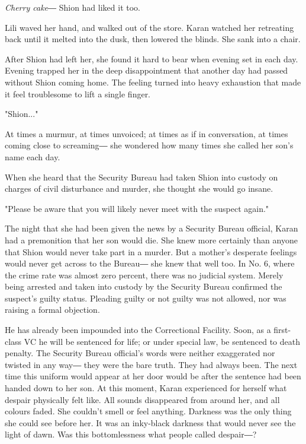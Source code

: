 \emph{Cherry cake―} Shion had liked it too.

Lili waved her hand, and walked out of the store. Karan watched her
retreating back until it melted into the dusk, then lowered the blinds.
She sank into a chair.

After Shion had left her, she found it hard to bear when evening set in
each day. Evening trapped her in the deep disappointment that another
day had passed without Shion coming home. The feeling turned into heavy
exhaustion that made it feel troublesome to lift a single finger.

"Shion..."

At times a murmur, at times unvoiced; at times as if in conversation, at
times coming close to screaming― she wondered how many times she called
her son's name each day.

When she heard that the Security Bureau had taken Shion into custody on
charges of civil disturbance and murder, she thought she would go
insane.

"Please be aware that you will likely never meet with the suspect
again."

The night that she had been given the news by a Security Bureau
official, Karan had a premonition that her son would die. She knew more
certainly than anyone that Shion would never take part in a murder. But
a mother's desperate feelings would never get across to the Bureau― she
knew that well too. In No. 6, where the crime rate was almost zero
percent, there was no judicial system. Merely being arrested and taken
into custody by the Security Bureau confirmed the suspect's guilty
status. Pleading guilty or not guilty was not allowed, nor was raising a
formal objection.

He has already been impounded into the Correctional Facility. Soon, as a
first-class VC he will be sentenced for life; or under special law, be
sentenced to death penalty. The Security Bureau official's words were
neither exaggerated nor twisted in any way― they were the bare truth.
They had always been. The next time this uniform would appear at her
door would be after the sentence had been handed down to her son. At
this moment, Karan experienced for herself what despair physically felt
like. All sounds disappeared from around her, and all colours faded. She
couldn't smell or feel anything. Darkness was the only thing she could
see before her. It was an inky-black darkness that would never see the
light of dawn. Was this bottomlessness what people called despair―?

